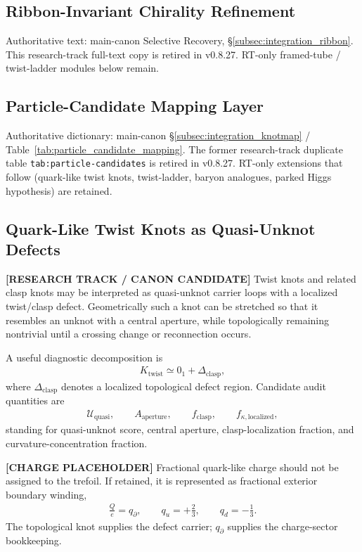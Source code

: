 \subsection{Ribbon-Invariant Chirality Refinement}
\noindent
Authoritative text: main-canon Selective Recovery, \S\ref{subsec:integration_ribbon}. This research-track full-text copy is retired in v0.8.27. RT-only framed-tube / twist-ladder modules below remain.

\subsection{Particle-Candidate Mapping Layer}
\noindent
Authoritative dictionary: main-canon \S\ref{subsec:integration_knotmap} / Table~\ref{tab:particle_candidate_mapping}. The former research-track duplicate table \texttt{tab:particle-candidates} is retired in v0.8.27. RT-only extensions that follow (quark-like twist knots, twist-ladder, baryon analogues, parked Higgs hypothesis) are retained.

\subsection{Quark-Like Twist Knots as Quasi-Unknot Defects}
\label{subsec:rt_quark_twist_quasi_unknot}

\textbf{[RESEARCH TRACK / CANON CANDIDATE]} Twist knots and related clasp knots may be interpreted as quasi-unknot carrier loops with a localized twist/clasp defect. Geometrically such a knot can be stretched so that it resembles an unknot with a central aperture, while topologically remaining nontrivial until a crossing change or reconnection occurs.

A useful diagnostic decomposition is
\begin{align}
    K_{\mathrm{twist}}
    \simeq
    0_1 + \Delta_{\mathrm{clasp}},
\end{align}
where $\Delta_{\mathrm{clasp}}$ denotes a localized topological defect region. Candidate audit quantities are
\begin{align}
    \mathcal{U}_{\mathrm{quasi}},\qquad
    A_{\mathrm{aperture}},\qquad
    f_{\mathrm{clasp}},\qquad
    f_{\kappa,\mathrm{localized}},
\end{align}
standing for quasi-unknot score, central aperture, clasp-localization fraction, and curvature-concentration fraction.

\textbf{[CHARGE PLACEHOLDER]} Fractional quark-like charge should not be assigned to the trefoil. If retained, it is represented as fractional exterior boundary winding,
\begin{align}
    \frac{Q}{e}=q_{\partial},
    \qquad
    q_u=+\frac{2}{3},
    \qquad
    q_d=-\frac{1}{3}.
\end{align}
The topological knot supplies the defect carrier; $q_{\partial}$ supplies the charge-sector bookkeeping.

